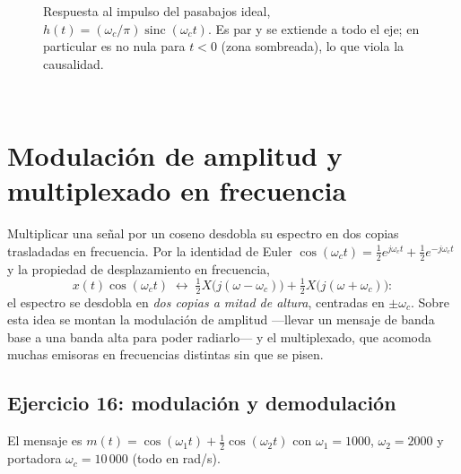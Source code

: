 \documentclass[10pt,a4paper]{article}
\newcommand{\tema}[1]{%
  \bigskip
  \noindent{\color{utnblue}\rule{\linewidth}{1pt}}\\[-0.4em]
  \section*{#1}
  \vspace{-0.6em}
}
\begin{document}
	\begin{figure}[H]
		\centering
		
		\caption{Respuesta al impulso del pasabajos ideal, $h(t)=(\omega_c/\pi)\operatorname{sinc}(\omega_c t)$. Es par y se extiende a todo el eje; en particular es no nula para $t<0$ (zona sombreada), lo que viola la causalidad.}
		\label{fig:sol_ej16}
	\end{figure}

	\tema{Modulación de amplitud y multiplexado en frecuencia}

	Multiplicar una señal por un coseno desdobla su espectro en dos copias trasladadas en frecuencia. Por la identidad de Euler $\cos(\omega_c t)=\tfrac12 e^{j\omega_c t}+\tfrac12 e^{-j\omega_c t}$ y la propiedad de desplazamiento en frecuencia,
	\[
		x(t)\cos(\omega_c t) \;\leftrightarrow\; \tfrac12 X\big(j(\omega-\omega_c)\big) + \tfrac12 X\big(j(\omega+\omega_c)\big):
	\]
	el espectro se desdobla en \emph{dos copias a mitad de altura}, centradas en $\pm\omega_c$. Sobre esta idea se montan la modulación de amplitud ---llevar un mensaje de banda base a una banda alta para poder radiarlo--- y el multiplexado, que acomoda muchas emisoras en frecuencias distintas sin que se pisen.

	\subsection*{Ejercicio 16: modulación y demodulación}

	El mensaje es $m(t)=\cos(\omega_1 t)+\tfrac12\cos(\omega_2 t)$ con $\omega_1=1000$, $\omega_2=2000$ y portadora $\omega_c=10\,000$ (todo en rad/s).
\end{document}
